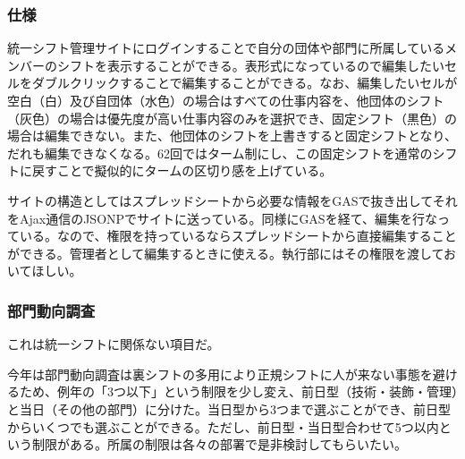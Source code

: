 \documentclass[dvipdfmx,jb5]{jarticle}
\begin{document}
 \subsubsection{仕様}
 統一シフト管理サイトにログインすることで自分の団体や部門に所属しているメンバーのシフトを表示することができる。表形式になっているので編集したいセルをダブルクリックすることで編集することができる。なお、編集したいセルが空白（白）及び自団体（水色）の場合はすべての仕事内容を、他団体のシフト（灰色）の場合は優先度が高い仕事内容のみを選択でき、固定シフト（黒色）の場合は編集できない。また、他団体のシフトを上書きすると固定シフトとなり、だれも編集できなくなる。62回ではターム制にし、この固定シフトを通常のシフトに戻すことで擬似的にタームの区切り感を上げている。

 サイトの構造としてはスプレッドシートから必要な情報をGASで抜き出してそれをAjax通信のJSONPでサイトに送っている。同様にGASを経て、編集を行なっている。なので、権限を持っているならスプレッドシートから直接編集することができる。管理者として編集するときに使える。執行部にはその権限を渡しておいてほしい。

 \subsubsection{部門動向調査}
 これは統一シフトに関係ない項目だ。

 今年は部門動向調査は裏シフトの多用により正規シフトに人が来ない事態を避けるため、例年の「3つ以下」という制限を少し変え、前日型（技術・装飾・管理）と当日（その他の部門）に分けた。当日型から3つまで選ぶことができ、前日型からいくつでも選ぶことができる。ただし、前日型・当日型合わせて5つ以内という制限がある。所属の制限は各々の部署で是非検討してもらいたい。
\end{document}

